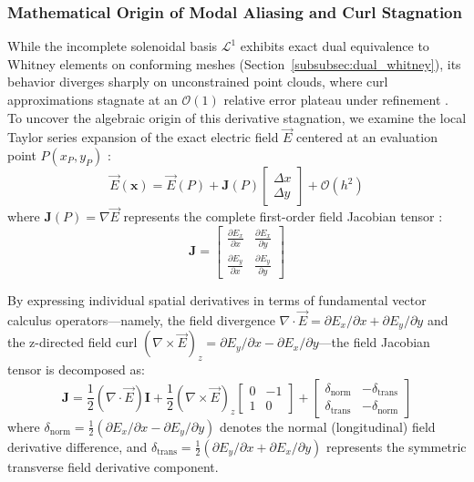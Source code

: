 \documentclass[preprint,12pt]{elsarticle}
\begin{document}
\subsubsection{Mathematical Origin of Modal Aliasing and Curl Stagnation}
\label{subsec:L1_aliasing_analysis}

While the incomplete solenoidal basis $\mathcal{L}^1$ exhibits exact dual equivalence to Whitney elements on conforming meshes (Section~\ref{subsubsec:dual_whitney}), its behavior diverges sharply on unconstrained point clouds, where curl approximations stagnate at an $\mathcal{O}(1)$ relative error plateau under refinement \cite{goncalves2025tese}. To uncover the algebraic origin of this derivative stagnation, we examine the local Taylor series expansion of the exact electric field $\vec{E}$ centered at an evaluation point $P(x_P, y_P)$ \cite{li2007meshfree, liu2009mesh}:
\begin{equation}
\vec{E}(\mathbf{x}) = \vec{E}(P) + \mathbf{J}(P) \begin{bmatrix} \Delta x \\[2pt] \Delta y \end{bmatrix} + \mathcal{O}(h^2)
\label{eq:taylor_vector_expansion}
\end{equation}
where $\mathbf{J}(P) = \nabla \vec{E}$ represents the complete first-order field Jacobian tensor \cite{liu2009mesh}:
\begin{equation}
\mathbf{J} = \begin{bmatrix} 
\frac{\partial E_x}{\partial x} & \frac{\partial E_x}{\partial y} \\[4pt]
\frac{\partial E_y}{\partial x} & \frac{\partial E_y}{\partial y} 
\end{bmatrix}
\label{eq:jacobian_tensor_raw}
\end{equation}

By expressing individual spatial derivatives in terms of fundamental vector calculus operators---namely, the field divergence $\nabla \cdot \vec{E} = \partial E_x/\partial x + \partial E_y/\partial y$ and the z-directed field curl $(\nabla \times \vec{E})_z = \partial E_y/\partial x - \partial E_x/\partial y$---the field Jacobian tensor is decomposed as:
\begin{equation}
\mathbf{J} = \frac{1}{2}(\nabla \cdot \vec{E}) \mathbf{I} + \frac{1}{2}(\nabla \times \vec{E})_z \begin{bmatrix} 0 & -1 \\ 1 & 0 \end{bmatrix} + \begin{bmatrix} \delta_{\mathrm{norm}} & -\delta_{\mathrm{trans}} \\ \delta_{\mathrm{trans}} & -\delta_{\mathrm{norm}} \end{bmatrix}
\label{eq:jacobian_tensor_EM_decomposition}
\end{equation}
where $\delta_{\mathrm{norm}} = \frac{1}{2}(\partial E_x/\partial x - \partial E_y/\partial y)$ denotes the normal (longitudinal) field derivative difference, and $\delta_{\mathrm{trans}} = \frac{1}{2}(\partial E_y/\partial x + \partial E_x/\partial y)$ represents the symmetric transverse field derivative component.
\end{document}
